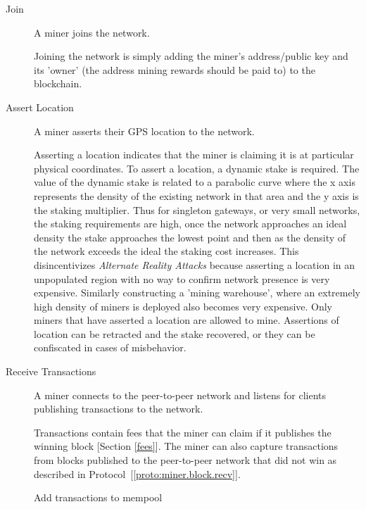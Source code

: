 \documentclass[10pt, nonatbib, nocopyrightspace, reprint]{sigplanconf}
\begin{document}
\begin{description}
  \item [Join] A miner joins the network.

    Joining the network is simply adding the miner's address/public key and its 'owner' (the address mining rewards should be paid to) to the blockchain.

  \item [Assert Location] A miner asserts their GPS location to the network.

    Asserting a location indicates that the miner is claiming it is at particular physical coordinates. To assert a location, a dynamic stake is required. The value of the dynamic stake is related to a parabolic curve where the x axis represents the density of the existing network in that area and the y axis is the staking multiplier. Thus for singleton gateways, or very small networks, the staking requirements are high, once the network approaches an ideal density the stake approaches the lowest point and then as the density of the network exceeds the ideal the staking cost increases. This disincentivizes \emph{Alternate Reality Attacks} because asserting a location in an unpopulated region with no way to confirm network presence is very expensive. Similarly constructing a 'mining warehouse', where an extremely high density of miners is deployed also becomes very expensive. Only miners that have asserted a location are allowed to mine. Assertions of location can be retracted and the stake recovered, or they can be confiscated in cases of misbehavior.

  \item [Receive Transactions] A miner connects to the peer-to-peer network and listens for clients publishing transactions to the network.

    Transactions contain fees that the miner can claim if it publishes the winning block [Section \ref{fees}]. The miner can also capture transactions from blocks published to the peer-to-peer network that did not win as described in Protocol~[\ref{proto:miner.block.recv}].

    \begin{algorithm}[!htb]
      \DontPrintSemicolon
      \caption{Miner Receive Transactions}\label{proto:miner.trans.recv}

       {
        Add transactions to mempool\;
      }
    \end{algorithm}
    \FloatBarrier


\end{description}
\end{document}
